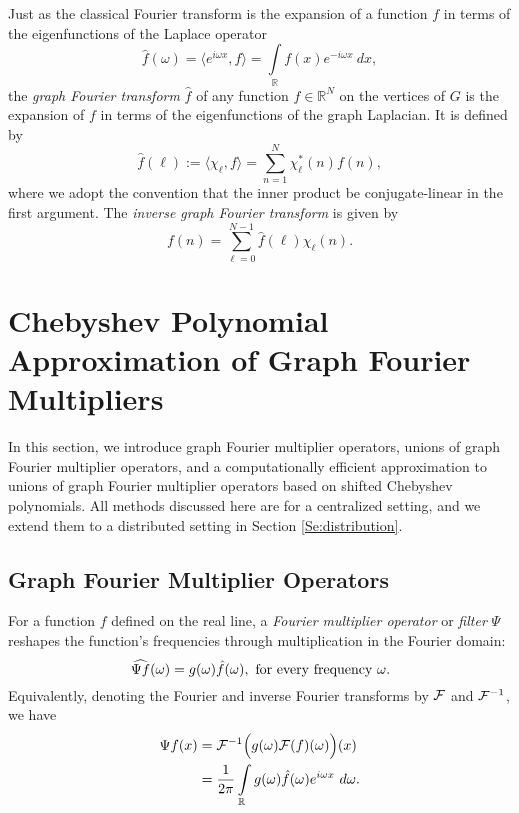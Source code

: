 \documentclass[conference]{IEEEtran}
\renewcommand{\l}{\ell}
\newcommand{\Rbb}{\mathbb{R}}
\begin{document}
Just as the classical Fourier transform is the expansion of a function $f$ in terms of the eigenfunctions of the Laplace operator
\begin{equation*}
\hat{f}(\omega)= \langle e^{i \omega x},f\rangle = \int\limits_{\Rbb}f(x)  e^{-i\omega x}~dx,
\end{equation*}
the \emph{graph Fourier transform} $\hat{f}$ of any function $f\in\mathbb{R}^{N}$ on the vertices of $G$
is the expansion of $f$ in terms of the eigenfunctions of the graph Laplacian. It is defined by
\begin{equation}\label{Eq:graph_FT}
\hat{f}(\l) := \langle \chi_{\l},f\rangle = \sum_{n=1}^N \chi^*_{\l}(n) f(n),
\end{equation}
where we adopt the convention that the inner product be
  conjugate-linear in the first argument. The \emph{inverse graph Fourier transform} is given by
\begin{equation}\label{Eq:graph_IFT}
f(n) = \sum_{\l=0}^{N-1} \hat{f}(\l) \chi_{\l}(n).
\end{equation}


\section{Chebyshev Polynomial Approximation of Graph Fourier Multipliers} \label{Se:GFM}
In this section, we introduce graph Fourier multiplier operators, unions of graph Fourier multiplier operators, and a computationally efficient approximation to unions of graph Fourier multiplier operators based on shifted Chebyshev polynomials.
All methods discussed here are for
a centralized setting, and we extend them to a distributed setting in Section \ref{Se:distribution}.



\subsection{Graph Fourier Multiplier Operators} \label{Se:gfmo}
For a function $f$ defined on the real line,
a \emph{Fourier multiplier operator} or \emph{filter} $\Psi$ reshapes the function's
frequencies through multiplication in the Fourier domain:
\begin{equation*}
\widehat{\Psi f}(\omega) = g(\omega)\hat{f}(\omega),\hbox{ for every frequency } \omega.
\end{equation*}
Equivalently,
denoting the Fourier and inverse Fourier transforms by ${\cal F}$ and ${\cal F}^{-1}$, we have
\begin{align}\label{Eq:multiplier_def}
\Psi f(x) &= {\cal F}^{-1}\Bigl(g(\omega){\cal F}(f)(\omega)\Bigr)(x) \\
&= \frac{1}{2\pi}\int\limits_{\Rbb}g(\omega) \hat{f}(\omega) e^{i\omega x}~d\omega. \nonumber
\end{align}
\end{document}
